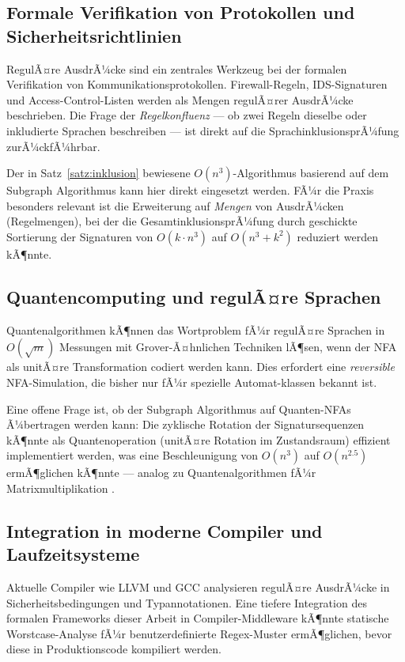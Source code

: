 ﻿\documentclass[a4paper,12pt]{article}
\theoremstyle{definition}
\begin{document}
\subsection{Formale Verifikation von Protokollen und Sicherheitsrichtlinien}

RegulÃ¤re AusdrÃ¼cke sind ein zentrales Werkzeug bei der formalen Verifikation
von Kommunikationsprotokollen. Firewall-Regeln, IDS-Signaturen und
Access-Control-Listen werden als Mengen regulÃ¤rer AusdrÃ¼cke beschrieben. Die
Frage der \emph{Regelkonfluenz} --- ob zwei Regeln dieselbe oder inkludierte
Sprachen beschreiben --- ist direkt auf die SprachinklusionsprÃ¼fung zurÃ¼ckfÃ¼hrbar.

Der in Satz~\ref{satz:inklusion} bewiesene $O(n^3)$-Algorithmus basierend auf
dem Subgraph Algorithmus kann hier direkt eingesetzt werden. FÃ¼r die Praxis
besonders relevant ist die Erweiterung auf \emph{Mengen} von AusdrÃ¼cken (Regelmengen),
bei der die GesamtinklusionsprÃ¼fung durch geschickte Sortierung der Signaturen
von $O(k \cdot n^3)$ auf $O(n^3 + k^2)$ reduziert werden kÃ¶nnte.

\subsection{Quantencomputing und regulÃ¤re Sprachen}

Quantenalgorithmen kÃ¶nnen das Wortproblem fÃ¼r regulÃ¤re Sprachen in
$O(\sqrt{m})$ Messungen mit Grover-Ã¤hnlichen Techniken lÃ¶sen, wenn der NFA
als unitÃ¤re Transformation codiert werden kann. Dies erfordert eine
\emph{reversible} NFA-Simulation, die bisher nur fÃ¼r spezielle Automat-klassen
bekannt ist.

Eine offene Frage ist, ob der Subgraph Algorithmus auf Quanten-NFAs Ã¼bertragen
werden kann: Die zyklische Rotation der Signatursequenzen kÃ¶nnte als
Quantenoperation (unitÃ¤re Rotation im Zustandsraum) effizient implementiert
werden, was eine Beschleunigung von $O(n^3)$ auf $O(n^{2.5})$ ermÃ¶glichen kÃ¶nnte
--- analog zu Quantenalgorithmen fÃ¼r Matrixmultiplikation \cite{qsubgraph2026}.

\subsection{Integration in moderne Compiler und Laufzeitsysteme}

Aktuelle Compiler wie LLVM und GCC analysieren regulÃ¤re AusdrÃ¼cke in
Sicherheitsbedingungen und Typannotationen. Eine tiefere Integration des
formalen Frameworks dieser Arbeit in Compiler-Middleware kÃ¶nnte statische
Worstcase-Analyse fÃ¼r benutzerdefinierte Regex-Muster ermÃ¶glichen, bevor
diese in Produktionscode kompiliert werden.
\end{document}
